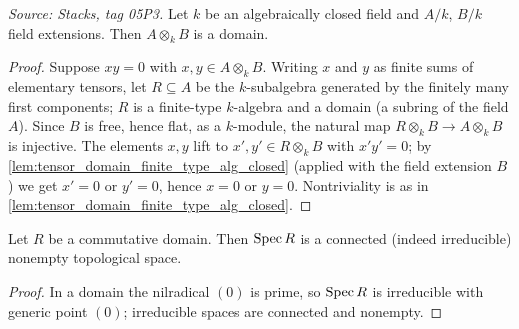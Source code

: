 \begin{lemma}\leanok
  \label{lem:tensor_domain_alg_closed}
  \textit{Source: Stacks, tag 05P3.}
  Let \(k\) be an algebraically closed field and \(A/k\), \(B/k\) field
  extensions. Then \(A \otimes_k B\) is a domain.
\end{lemma}
\begin{proof}
  \leanok
  Suppose \(x y = 0\) with \(x, y \in A \otimes_k B\). Writing \(x\) and
  \(y\) as finite sums of elementary tensors, let \(R \subseteq A\) be
  the \(k\)-subalgebra generated by the finitely many first components;
  \(R\) is a finite-type \(k\)-algebra and a domain (a subring of the
  field \(A\)). Since \(B\) is free, hence flat, as a \(k\)-module, the
  natural map \(R \otimes_k B \to A \otimes_k B\) is injective. The
  elements \(x, y\) lift to \(x', y' \in R \otimes_k B\) with
  \(x' y' = 0\); by \cref{lem:tensor_domain_finite_type_alg_closed}
  (applied with the field extension \(B\)) we get \(x' = 0\) or
  \(y' = 0\), hence \(x = 0\) or \(y = 0\). Nontriviality is as in
  \cref{lem:tensor_domain_finite_type_alg_closed}.
\end{proof}

\begin{lemma}\leanok
  \label{lem:spec_domain_connected}
  Let \(R\) be a commutative domain. Then \(\operatorname{Spec} R\) is a connected
  (indeed irreducible) nonempty topological space.
\end{lemma}
\begin{proof}
  \leanok
  In a domain the nilradical \((0)\) is prime, so \(\operatorname{Spec} R\) is
  irreducible with generic point \((0)\); irreducible spaces are
  connected and nonempty.
\end{proof}


